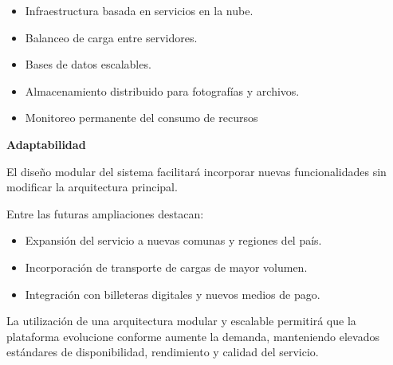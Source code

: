 \begin{itemize}
	\item Infraestructura basada en servicios en la nube.
	\item Balanceo de carga entre servidores.
	\item Bases de datos escalables.
	\item Almacenamiento distribuido para fotografías y archivos.
	\item Monitoreo permanente del consumo de recursos
\end{itemize}

\noindent\textbf{Adaptabilidad}

El diseño modular del sistema facilitará incorporar nuevas funcionalidades sin modificar la arquitectura principal.

Entre las futuras ampliaciones destacan:

\begin{itemize}
	\item Expansión del servicio a nuevas comunas y regiones del país.
	\item Incorporación de transporte de cargas de mayor volumen.
	\item Integración con billeteras digitales y nuevos medios de pago.
\end{itemize}

La utilización de una arquitectura modular y escalable permitirá que la plataforma evolucione conforme aumente la demanda, manteniendo elevados estándares de disponibilidad, rendimiento y calidad del servicio.
